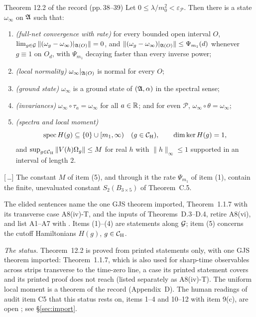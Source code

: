 \begin{recordbox}{Theorem 12.2 of the record (pp.\,38--39)}
Let $0\le\lambda/m_0^2<\varepsilon_{\mathscr P}$. Then there is a state $\omega_\infty$ on
$\mathfrak{A}$ such that:
\begin{enumerate}[leftmargin=2.2em]
\item[\textup{(1)}] \emph{(full-net convergence with rate)} for every bounded open interval
      $O$, $\lim_{g\in\mathcal{G}}\|(\omega_g-\omega_\infty)|_{\mathfrak{A}(O)}\|=0$, and
      $\|(\omega_g-\omega_\infty)|_{\mathfrak{A}(O)}\|\le\Psi_{m_1}(d)$ whenever $g\equiv1$ on $O_d$,
      with $\Psi_{m_1}$ decaying faster than every inverse power;
\item[\textup{(2)}] \emph{(local normality)} $\omega_\infty|_{\mathfrak{A}(O)}$ is normal for every $O$;
\item[\textup{(3)}] \emph{(ground state)} $\omega_\infty$ is a ground state of $(\mathfrak{A},\alpha)$
      in the spectral sense;
\item[\textup{(4)}] \emph{(invariances)} $\omega_\infty\circ\tau_a=\omega_\infty$ for all
      $a\in\mathbb{R}$; and for even $\mathscr P$, $\omega_\infty\circ\theta=\omega_\infty$;
\item[\textup{(5)}] \emph{(spectra and local moment)}
      \[
       \operatorname{spec} H(g)\subseteq\{0\}\cup[m_1,\infty)\quad(g\in\mathcal{C}_{\mathrm H}),
       \qquad \dim\ker H(g)=1,
      \]
      and $\sup_{g\in\mathcal{C}_{\mathrm H}}\|V(h)\Omega_g\|\le M$ for real $h$ with $\|h\|_\infty\le1$ supported
      in an interval of length $2$.
\end{enumerate}
[\,\dots] The constant $M$ of item (5), and through it the rate $\Psi_{m_1}$ of item (1),
contain the finite, unevaluated constant $S_2(B_{3\times5})$ of Theorem~C.5.
\end{recordbox}

The elided sentences name the one GJS theorem imported, Theorem~1.1.7 with its transverse
case A8(iv)-T, and the inputs of Theorems~D.3--D.4, retire A8(vi), and list A1--A7 with
. Items (1)--(4) are statements along $\mathcal{G}$; item (5) concerns the
cutoff Hamiltonians $H(g)$, $g\in\mathcal{C}_{\mathrm H}$.

\emph{The status.}
Theorem~12.2 is proved from printed statements only, with one GJS theorem imported:
Theorem~1.1.7, which is also used for sharp-time observables across strips transverse to
the time-zero line, a case its printed statement covers and its printed proof does not
reach (listed separately as A8(iv)-T). The uniform local moment is a theorem of the record
(Appendix~D). The human readings of audit item C5 that this status rests on, items 1--4
and 10--12 with item 9(c), are open ; see
\S\ref{sec:import}.

